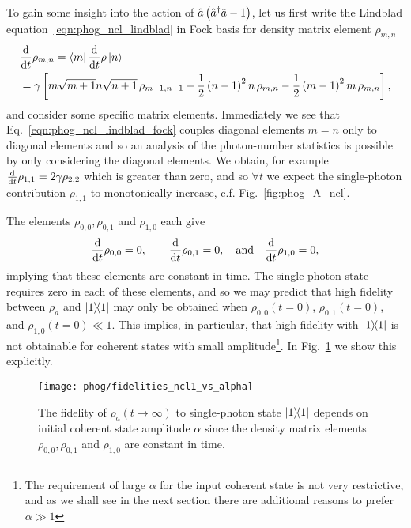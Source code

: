 To gain some insight into the action of $\hat{a}\left(\hat{a}^\dagger \hat{a} - 1\right)$, let us first write the Lindblad equation~\ref{eqn:phog_ncl_lindblad} in Fock basis for density matrix element $\rho_{m, n}$
\begin{align}\label{eqn:phog_ncl_lindblad_fock}
&\ddt \rho_{m, n} = \bra{m} \ddt \rho \ket{n} \notag  \\
%
&= \gamma \left[ m \sqrt{m+1} n \sqrt{n+1} \, \rho_{m+1, n+1} - \frac{1}{2} \left(n-1\right)^2 n\, \rho_{m, n} - \frac{1}{2} \left(m-1\right)^2 m\, \rho_{m, n}\right],
\end{align}
and consider some specific matrix elements. Immediately we see that Eq.~\ref{eqn:phog_ncl_lindblad_fock} couples diagonal elements $m=n$ only to diagonal elements and so an analysis of the photon-number statistics is possible by only considering the diagonal elements. We obtain, for example $\frac{\mathrm{d}}{\mathrm{d}t} \rho_{1, 1}=2 \gamma \rho_{2, 2}$ which is greater than zero, and so $\forall t$ we expect the single-photon contribution $\rho_{1,1}$ to monotonically increase, c.f. Fig.~\ref{fig:phog_A_ncl}. 

\noindent The elements $\rho_{0, 0}, \rho_{0, 1}$ and $\rho_{1, 0}$ each give
\begin{equation}
\ddt \rho_{0,0} = 0, \qq{} \ddt \rho_{0, 1} = 0, \qq{and} \ddt\rho_{1, 0} = 0,
\end{equation}
implying that these elements are constant in time. The single-photon state requires zero in each of these elements, and so we may predict that high fidelity between $\rho_a$ and $\dyad{1}$ may only be obtained when $\rho_{0,0}\left(t=0\right)$, $\rho_{0, 1}\left(t=0\right)$, and $\rho_{1, 0}\left(t=0\right) \ll 1$. This implies, in particular, that high fidelity with $\dyad{1}$ is not obtainable for coherent states with small amplitude\footnote{The requirement of large $\alpha$ for the input coherent state is not very restrictive, and as we shall see in the next section there are additional reasons to prefer $\alpha \gg 1$}. In Fig.~\ref{fig:phog_fidelity_ncl_vs_alpha} we show this explicitly.

\begin{figure}[htp]
\captionsetup{width=\linewidth}
\centering
\texttt{[image: phog/fidelities\_ncl1\_vs\_alpha]}
\caption{\label{fig:phog_fidelity_ncl_vs_alpha} The fidelity of $\rho_a\left(t\rightarrow\infty\right)$ to single-photon state $\dyad{1}$ depends on initial coherent state amplitude $\alpha$ since the density matrix elements $\rho_{0, 0}, \rho_{0, 1}$ and $\rho_{1, 0}$ are constant in time. %
}
\end{figure}




